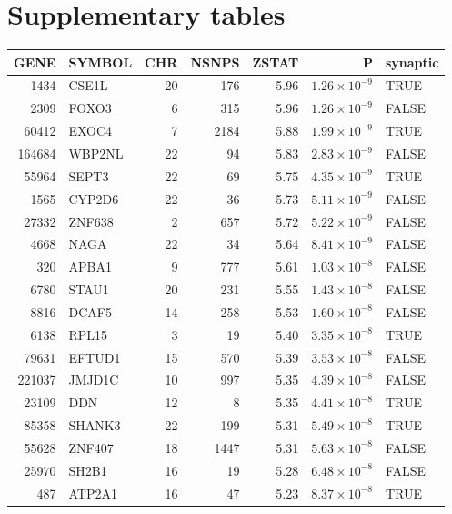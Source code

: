 \chapter{Supplementary tables}




\begin{table}[ht]
\centering
\begin{tabular}{rlrrrrl}
  \hline
GENE & SYMBOL & CHR & NSNPS & ZSTAT & P & synaptic \\ 
  \hline
1434 & CSE1L &  20 & 176 & 5.96 & $1.26 \times 10^{-9}$ & TRUE \\ 
  2309 & FOXO3 &   6 & 315 & 5.96 & $1.26 \times 10^{-9}$ & FALSE \\ 
  60412 & EXOC4 &   7 & 2184 & 5.88 & $1.99 \times 10^{-9}$ & TRUE \\ 
  164684 & WBP2NL &  22 &  94 & 5.83 & $2.83 \times 10^{-9}$ & FALSE \\ 
  55964 & SEPT3 &  22 &  69 & 5.75 & $4.35 \times 10^{-9}$ & TRUE \\ 
  1565 & CYP2D6 &  22 &  36 & 5.73 & $5.11 \times 10^{-9}$ & FALSE \\ 
  27332 & ZNF638 &   2 & 657 & 5.72 & $5.22 \times 10^{-9}$ & FALSE \\ 
  4668 & NAGA &  22 &  34 & 5.64 & $8.41 \times 10^{-9}$ & FALSE \\ 
  320 & APBA1 &   9 & 777 & 5.61 & $1.03 \times 10^{-8}$ & FALSE \\ 
  6780 & STAU1 &  20 & 231 & 5.55 & $1.43 \times 10^{-8}$ & FALSE \\ 
  8816 & DCAF5 &  14 & 258 & 5.53 & $1.60 \times 10^{-8}$ & FALSE \\ 
  6138 & RPL15 &   3 &  19 & 5.40 & $3.35 \times 10^{-8}$ & TRUE \\ 
  79631 & EFTUD1 &  15 & 570 & 5.39 & $3.53 \times 10^{-8}$ & FALSE \\ 
  221037 & JMJD1C &  10 & 997 & 5.35 & $4.39 \times 10^{-8}$ & FALSE \\ 
  23109 & DDN &  12 &   8 & 5.35 & $4.41 \times 10^{-8}$ & TRUE \\ 
  85358 & SHANK3 &  22 & 199 & 5.31 & $5.49 \times 10^{-8}$ & TRUE \\ 
  55628 & ZNF407 &  18 & 1447 & 5.31 & $5.63 \times 10^{-8}$ & FALSE \\ 
  25970 & SH2B1 &  16 &  19 & 5.28 & $6.48 \times 10^{-8}$ & FALSE \\ 
  487 & ATP2A1 &  16 &  47 & 5.23 & $8.37 \times 10^{-8}$ & TRUE \\ 

\end{tabular}
\end{table}

